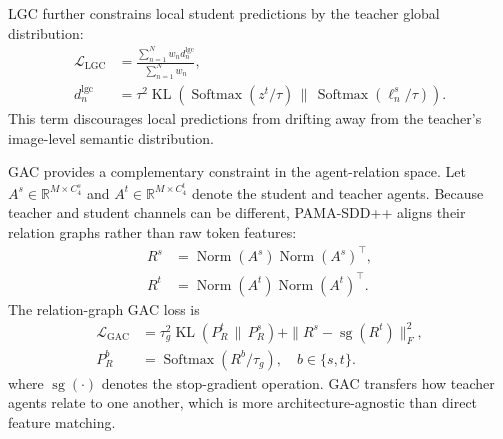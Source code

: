 \documentclass[a4paper,fleqn]{cas-dc}
\begin{document}
LGC further constrains local student predictions by the teacher global
distribution:
\begin{equation}
\begin{aligned}
    \mathcal{L}_{\operatorname{LGC}}
    &=\frac{\sum_{n=1}^{N}w_n d_n^{\operatorname{lgc}}}
    {\sum_{n=1}^{N}w_n},\\
    d_n^{\operatorname{lgc}}
    &=\tau^2\operatorname{KL}\left(
    \operatorname{Softmax}(z^t/\tau)
    \,\|\,\operatorname{Softmax}(\ell_n^s/\tau)\right).
\end{aligned}
\label{eq:loss_lgc}
\end{equation}
This term discourages local predictions from drifting away from the teacher's
image-level semantic distribution.

GAC provides a complementary constraint in the agent-relation space. Let
$A^s\in\mathbb{R}^{M\times C_4^s}$ and
$A^t\in\mathbb{R}^{M\times C_4^t}$ denote the student and teacher agents.
Because teacher and student channels can be different, PAMA-SDD++ aligns
their relation graphs rather than raw token features:
\begin{equation}
\begin{aligned}
    R^s&=\operatorname{Norm}(A^s)\operatorname{Norm}(A^s)^\top,\\
    R^t&=\operatorname{Norm}(A^t)\operatorname{Norm}(A^t)^\top .
\end{aligned}
\label{eq:gac_relation}
\end{equation}
The relation-graph GAC loss is
\begin{equation}
\begin{aligned}
    \mathcal{L}_{\operatorname{GAC}}
    &=
    \tau_g^2
    \operatorname{KL}\left(P_R^t\,\|\,P_R^s\right)
    +\|R^s-\operatorname{sg}(R^t)\|_F^2,\\
    P_R^b&=\operatorname{Softmax}(R^b/\tau_g),\quad b\in\{s,t\}.
\end{aligned}
\label{eq:loss_gac}
\end{equation}
where $\operatorname{sg}(\cdot)$ denotes the stop-gradient operation. GAC
transfers how teacher agents relate to one another, which is more
architecture-agnostic than direct feature matching.
\end{document}
